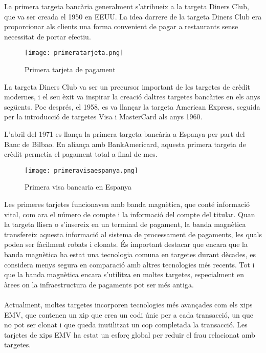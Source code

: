 
La primera targeta bancària generalment s'atribueix a la targeta Diners Club, que va ser creada el 1950 en EEUU. La idea darrere de la targeta Diners Club era proporcionar als clients una forma convenient de pagar a restaurants sense necessitat de portar efectiu.

\begin{figure}[h]
    \centering
    \texttt{[image: primeratarjeta.png]}
    \caption{Primera tarjeta de pagament}
\end{figure}  


La targeta Diners Club va ser un precursor important de les targetes de crèdit modernes, i el seu èxit va inspirar la creació daltres targetes bancàries en els anys següents. Poc després, el 1958, es va llançar la targeta American Express, seguida per la introducció de targetes Visa i MasterCard als anys 1960.


L'abril del 1971 es llança la primera targeta bancària a Espanya per part del Banc de Bilbao. En aliança amb BankAmericard, aquesta primera targeta de crèdit permetia el pagament total a final de mes.
\begin{figure}[h]
    \centering
    \texttt{[image: primeravisaespanya.png]}
    \caption{Primera visa bancaria en Espanya}
\end{figure}  

Les primeres tarjetes funcionaven amb banda magnètica, que conté informació vital, com ara el número de compte i la informació del compte del titular. Quan la targeta llisca o s'insereix en un terminal de pagament, la banda magnètica transfereix aquesta informació al sistema de processament de pagaments, les quals poden ser fàcilment robats i clonats. És important destacar que encara que la banda magnètica ha estat una tecnologia comuna en targetes durant dècades, es considera menys segura en comparació amb altres tecnologies més recents. Tot i que la banda magnètica encara s'utilitza en moltes targetes, especialment en àrees on la infraestructura de pagaments pot ser més antiga. 
\\
\\
Actualment, moltes targetes incorporen tecnologies més avançades com els xips EMV, que contenen un xip que crea un codi únic per a cada transacció, un que no pot ser clonat i que queda inutilitzat un cop completada la transacció. Les tarjetes de xips EMV ha estat un esforç global per reduir el frau relacionat amb targetes. 


